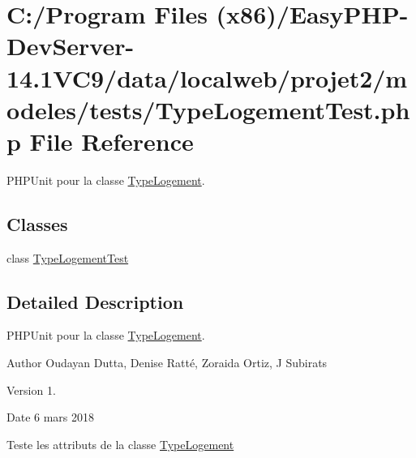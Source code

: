 \hypertarget{_type_logement_test_8php}{}\section{C\+:/\+Program Files (x86)/\+Easy\+P\+H\+P-\/\+Dev\+Server-\/14.1\+V\+C9/data/localweb/projet2/modeles/tests/\+Type\+Logement\+Test.php File Reference}
\label{_type_logement_test_8php}


P\+H\+P\+Unit pour la classe \hyperlink{class_type_logement}{Type\+Logement}.  


\subsection*{Classes}
\begin{DoxyCompactItemize}
\item 
class \hyperlink{class_type_logement_test}{Type\+Logement\+Test}
\end{DoxyCompactItemize}


\subsection{Detailed Description}
P\+H\+P\+Unit pour la classe \hyperlink{class_type_logement}{Type\+Logement}. 

\begin{DoxyAuthor}{Author}
Oudayan Dutta, Denise Ratté, Zoraida Ortiz, J Subirats 
\end{DoxyAuthor}
\begin{DoxyVersion}{Version}
1. 
\end{DoxyVersion}
\begin{DoxyDate}{Date}
6 mars 2018
\end{DoxyDate}
Teste les attributs de la classe \hyperlink{class_type_logement}{Type\+Logement} 